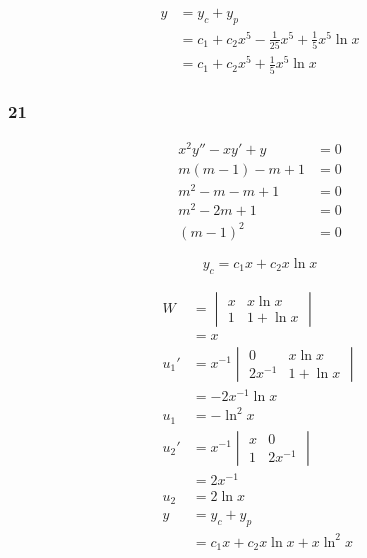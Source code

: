\documentclass{article}
\begin{document}
\begin{align*}
  y & = y_c + y_p                                                \\
    & = c_1 + c_2 x^5 - \frac{1}{25} x^5 + \frac{1}{5} x^5 \ln x \\
    & = c_1 + c_2 x^5 + \frac{1}{5} x^5 \ln x
\end{align*}

\subsubsection{21}

\begin{align*}
  x^2 y'' - x y' + y & = 0 \\
  m (m - 1) - m + 1  & = 0 \\
  m^2 - m - m + 1    & = 0 \\
  m^2 - 2m + 1       & = 0 \\
  (m - 1)^2          & = 0
\end{align*}

\[y_c = c_1 x + c_2 x \ln x\]

\begin{align*}
  W    & = \begin{vmatrix}
             x & x \ln x   \\
             1 & 1 + \ln x
           \end{vmatrix}                  \\
       & = x                               \\
  u_1' & = x^{-1} \begin{vmatrix}
                    0       & x \ln x   \\
                    2x^{-1} & 1 + \ln x
                  \end{vmatrix}      \\
       & = -2 x^{-1} \ln x                 \\
  u_1  & = -\ln^2 x                        \\
  u_2' & = x^{-1} \begin{vmatrix}
                    x & 0       \\
                    1 & 2x^{-1}
                  \end{vmatrix}           \\
       & = 2x^{-1}                         \\
  u_2  & = 2 \ln x                         \\
  y    & = y_c + y_p                       \\
       & = c_1 x + c_2 x \ln x + x \ln^2 x
\end{align*}
\end{document}
